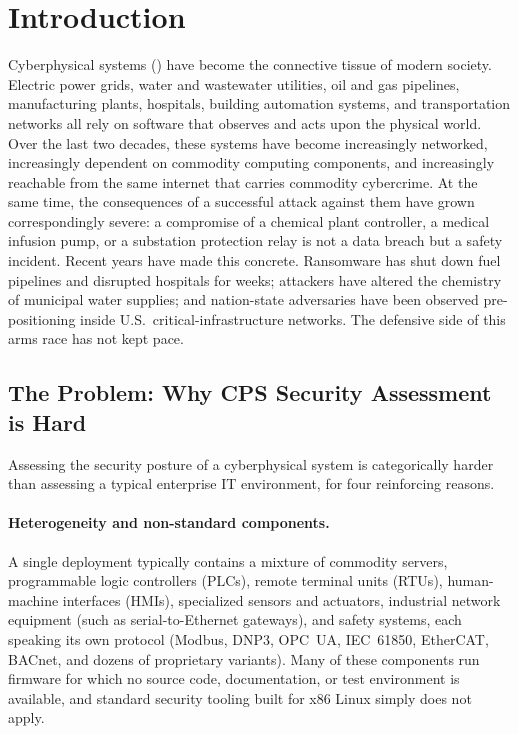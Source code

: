 \section{Introduction}
\label{sec:intro}

Cyberphysical systems (\CPSs) have become the connective tissue of
modern society. Electric power grids, water and wastewater utilities,
oil and gas pipelines, manufacturing plants, hospitals, building
automation systems, and transportation networks all rely on software
that observes and acts upon the physical world. Over the last two
decades, these systems have become increasingly networked, increasingly
dependent on commodity computing components, and increasingly reachable
from the same internet that carries commodity cybercrime. At the same
time, the consequences of a successful attack against them have grown
correspondingly severe: a compromise of a chemical plant controller,
a medical infusion pump, or a substation protection relay is not a
data breach but a safety incident. Recent years have made this concrete.
Ransomware has shut down fuel pipelines and disrupted hospitals for
weeks; attackers have altered the chemistry of municipal water supplies;
and nation-state adversaries have been observed pre-positioning inside
U.S.\ critical-infrastructure networks. The defensive side of this
arms race has not kept pace.

\subsection{The Problem: Why CPS Security Assessment is Hard}
\label{sec:intro-problem}

Assessing the security posture of a cyberphysical system is categorically
harder than assessing a typical enterprise IT environment, for four
reinforcing reasons.

\paragraph{Heterogeneity and non-standard components.}
A single \cps deployment typically contains a mixture of commodity
servers, programmable logic controllers (PLCs), remote terminal units
(RTUs), human-machine interfaces (HMIs), specialized sensors and
actuators, industrial network equipment (such as serial-to-Ethernet
gateways), and safety systems, each speaking its own protocol (Modbus,
DNP3, OPC~UA, IEC~61850, EtherCAT, BACnet, and dozens of proprietary
variants). Many of these components run firmware for which no source
code, documentation, or test environment is available, and standard
security tooling built for x86 Linux simply does not apply.

